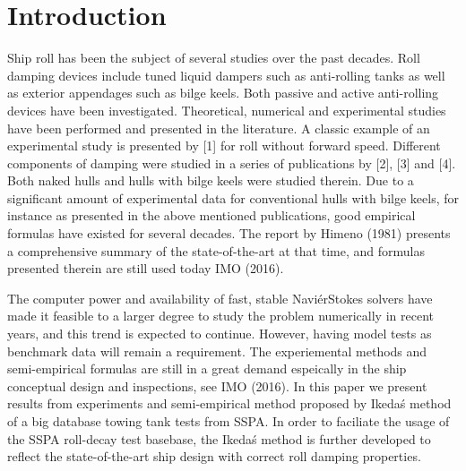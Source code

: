 \section{Introduction}
\label{se:introduction}

%    
			
Ship roll has been the subject of several studies over the past decades. Roll damping devices include tuned liquid dampers such as anti-rolling tanks as well as exterior appendages such as bilge keels. Both passive and active anti-rolling devices have been investigated. Theoretical, numerical and experimental studies have been performed and presented in the literature. A classic example of an experimental study is presented by [1] for roll without forward speed. Different components of damping were studied in a series of publications by [2], [3] and [4]. Both naked hulls and hulls with bilge keels were
studied therein. Due to a significant amount of
experimental data for conventional hulls with bilge keels, for instance as presented in the above mentioned publications, good empirical formulas have existed for several decades. The report by Himeno (1981) presents a comprehensive summary of the state-of-the-art at that time, and formulas presented therein are still used today IMO (2016).

The computer power and availability of fast, stable NaviérStokes solvers have made it feasible to a larger degree to study the problem numerically in recent years, and this trend is expected to continue. However, having model tests as benchmark data will remain a requirement. The experiemental methods and semi-empirical formulas are still in a great demand espeically in the ship conceptual design and inspections, see IMO (2016). In this paper we present results from experiments and semi-empirical method proposed by Ikeda\'s method of a big database towing tank tests from SSPA. In order to faciliate the usage of the SSPA roll-decay test basebase, the Ikeda\'s method is further developed to reflect the state-of-the-art ship design with correct roll damping properties. 

